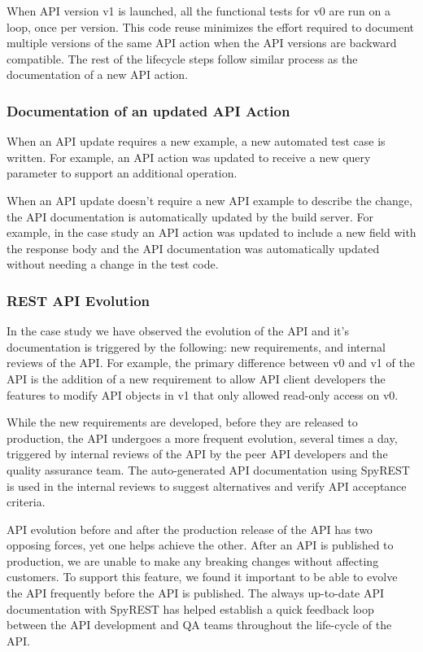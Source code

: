 When API version v1 is launched, all the functional tests for v0 are run on a loop, once per version. This code reuse minimizes the effort required to document multiple versions of the same API action when the API versions are backward compatible. The rest of the lifecycle steps follow similar process as the documentation of a new API action.

\subsubsection{Documentation of an updated API Action}
When an API update requires a new example, a new automated test case is written. For example, an API action was updated to receive a new query parameter to support an additional operation.

When an API update doesn't require a new API example to describe the change, the API documentation is automatically updated by the build server. For example, in the case study an API action was updated to include a new field with the response body and the API documentation was automatically updated without needing a change in the test code.

\subsubsection{REST API Evolution} %
\label{sub:rest_api_evolution}
In the case study we have observed the evolution of the API and it's documentation is triggered by the following: new requirements, and internal reviews of the API. For example, the primary difference between v0 and v1 of the API is the addition of a new requirement to allow API client developers the features to modify API objects in v1 that only allowed read-only access on v0.

While the new requirements are developed, before they are released to production, the API undergoes a more frequent evolution, several times a day, triggered by internal reviews of the API by the peer API developers and the quality assurance team. The auto-generated API documentation using SpyREST is used in the internal reviews to suggest alternatives and verify API acceptance criteria.

API evolution before and after the production release of the API has two opposing forces, yet one helps achieve the other. After an API is published to production, we are unable to make any breaking changes without affecting customers. To support this feature, we found it important to be able to evolve the API frequently before the API is published. The always up-to-date API documentation with SpyREST has helped establish a quick feedback loop between the API development and QA teams throughout the life-cycle of the API.


